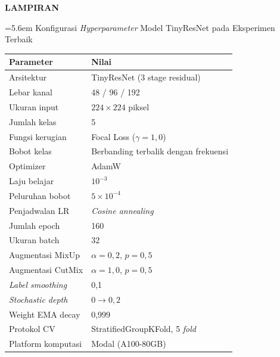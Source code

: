 
\clearpage
\vspace*{\fill}
\begin{center}
  {\fontsize{14pt}{17pt}\selectfont\bfseries LAMPIRAN}
\end{center}
\vspace*{\fill}

\clearpage

\label{lamp:hyperparameter}

\noindent\hangindent=5.6em
%
Konfigurasi \textit{Hyperparameter} Model TinyResNet pada Eksperimen Terbaik

\vspace{4pt}

\centering
\begin{tabular}{l l}
  \toprule
  \textbf{Parameter} & \textbf{Nilai} \\
  \midrule
  Arsitektur          & TinyResNet (3 stage residual) \\
  Lebar kanal         & 48 / 96 / 192 \\
  Ukuran input        & $224 \times 224$ piksel \\
  Jumlah kelas        & 5 \\
  Fungsi kerugian     & Focal Loss ($\gamma = 1{,}0$) \\
  Bobot kelas         & Berbanding terbalik dengan frekuensi \\
  Optimizer           & AdamW \\
  Laju belajar        & $10^{-3}$ \\
  Peluruhan bobot     & $5 \times 10^{-4}$ \\
  Penjadwalan LR      & \textit{Cosine annealing} \\
  Jumlah epoch        & 160 \\
  Ukuran batch        & 32 \\
  Augmentasi MixUp    & $\alpha = 0{,}2$, $p = 0{,}5$ \\
  Augmentasi CutMix   & $\alpha = 1{,}0$, $p = 0{,}5$ \\
  \textit{Label smoothing} & 0,1 \\
  \textit{Stochastic depth} & $0 \rightarrow 0{,}2$ \\
  Weight EMA decay    & 0,999 \\
  Protokol CV         & StratifiedGroupKFold, 5 \textit{fold} \\
  Platform komputasi  & Modal (A100-80GB) \\
  \bottomrule
\end{tabular}

